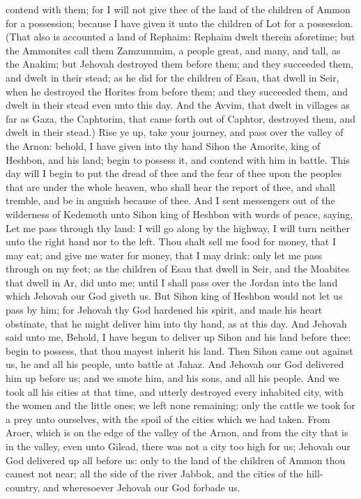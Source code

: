 contend with them; for I will not give thee of the land of the children of Ammon for a possession; because I have given it unto the children of Lot for a possession. (That also is accounted a land of Rephaim: Rephaim dwelt therein aforetime; but the Ammonites call them Zamzummim, a people great, and many, and tall, as the Anakim; but Jehovah destroyed them before them; and they succeeded them, and dwelt in their stead; as he did for the children of Esau, that dwell in Seir, when he destroyed the Horites from before them; and they succeeded them, and dwelt in their stead even unto this day. And the Avvim, that dwelt in villages as far as Gaza, the Caphtorim, that came forth out of Caphtor, destroyed them, and dwelt in their stead.) Rise ye up, take your journey, and pass over the valley of the Arnon: behold, I have given into thy hand Sihon the Amorite, king of Heshbon, and his land; begin to possess it, and contend with him in battle. This day will I begin to put the dread of thee and the fear of thee upon the peoples that are under the whole heaven, who shall hear the report of thee, and shall tremble, and be in anguish because of thee.  And I sent messengers out of the wilderness of Kedemoth unto Sihon king of Heshbon with words of peace, saying, Let me pass through thy land: I will go along by the highway, I will turn neither unto the right hand nor to the left. Thou shalt sell me food for money, that I may eat; and give me water for money, that I may drink: only let me pass through on my feet; as the children of Esau that dwell in Seir, and the Moabites that dwell in Ar, did unto me; until I shall pass over the Jordan into the land which Jehovah our God giveth us. But Sihon king of Heshbon would not let us pass by him; for Jehovah thy God hardened his spirit, and made his heart obstinate, that he might deliver him into thy hand, as at this day. And Jehovah said unto me, Behold, I have begun to deliver up Sihon and his land before thee: begin to possess, that thou mayest inherit his land. Then Sihon came out against us, he and all his people, unto battle at Jahaz. And Jehovah our God delivered him up before us; and we smote him, and his sons, and all his people. And we took all his cities at that time, and utterly destroyed every inhabited city, with the women and the little ones; we left none remaining: only the cattle we took for a prey unto ourselves, with the spoil of the cities which we had taken. From Aroer, which is on the edge of the valley of the Arnon, and from the city that is in the valley, even unto Gilead, there was not a city too high for us; Jehovah our God delivered up all before us: only to the land of the children of Ammon thou camest not near; all the side of the river Jabbok, and the cities of the hill-country, and wheresoever Jehovah our God forbade us. 

